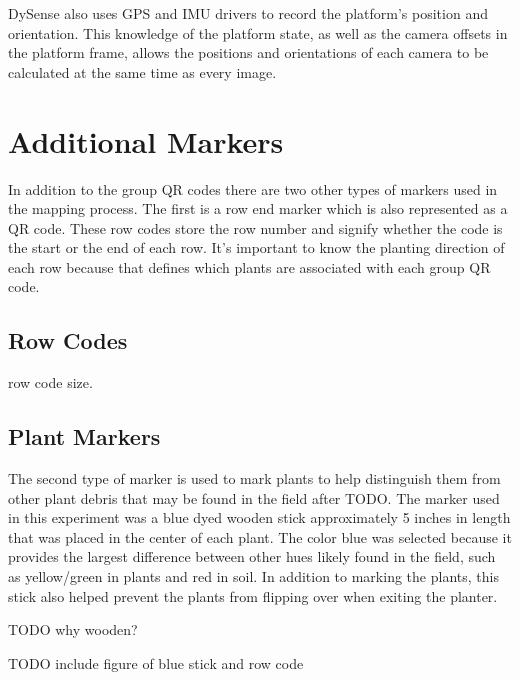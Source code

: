 DySense also uses GPS and IMU drivers to record the platform's position and orientation.  This knowledge of the platform state, as well as the camera offsets in the platform frame, allows the positions and orientations of each camera to be calculated at the same time as every image.    

\section{Additional Markers}
\label{system-markers}

In addition to the group QR codes there are two other types of markers used in the mapping process.  The first is a row end marker which is also represented as a QR code.  These row codes store the row number and signify whether the code is the start or the end of each row.  It's important to know the planting direction of each row because that defines which plants are associated with each group QR code.   

\subsection{Row Codes}

row code size.

\subsection{Plant Markers}

The second type of marker is used to mark plants to help distinguish them from other plant debris that may be found in the field after TODO.  The marker used in this experiment was a blue dyed wooden stick approximately 5 inches in length that was placed in the center of each plant. The color blue was selected because it provides the largest difference between other hues likely found in the field, such as yellow/green in plants and red in soil.  In addition to marking the plants, this stick also helped prevent the plants from flipping over when exiting the planter.

TODO why wooden?

TODO include figure of blue stick and row code
